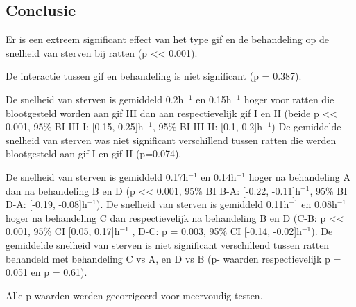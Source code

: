 \documentclass[
  12pt,dutch,coursenotes]{book}
\begin{document}
\hypertarget{conclusie-3}{%
\subsection{Conclusie}\label{conclusie-3}}

Er is een extreem significant effect van het type gif en de behandeling op de snelheid van sterven bij ratten (p \textless\textless{} 0.001).

De interactie tussen gif en behandeling is niet significant (p = 0.387).

De snelheid van sterven is gemiddeld 0.2h\(^{-1}\) en 0.15h\(^{-1}\) hoger voor ratten die blootgesteld worden aan gif III dan aan respectievelijk gif I en II (beide p \textless\textless{} 0.001, 95\% BI III-I: {[}0.15, 0.25{]}h\(^{-1}\), 95\% BI III-II: {[}0.1, 0.2{]}h\(^{-1}\))
De gemiddelde snelheid van sterven was niet significant verschillend tussen ratten die werden blootgesteld aan gif I en gif II (p=0.074).

De snelheid van sterven is gemiddeld 0.17h\(^{-1}\) en 0.14h\(^{-1}\) hoger na behandeling A dan na behandeling B en D (p \textless\textless{} 0.001, 95\% BI B-A: {[}-0.22, -0.11{]}h\(^{-1}\), 95\% BI D-A: {[}-0.19, -0.08{]}h\(^{-1}\)).
De snelheid van sterven is gemiddeld 0.11h\(^{-1}\) en 0.08h\(^{-1}\) hoger na behandeling C dan respectievelijk na behandeling B en D (C-B: p \textless\textless{} 0.001, 95\% CI {[}0.05, 0.17{]}h\(^{-1}\) , D-C: p = 0.003, 95\% CI {[}-0.14, -0.02{]}h\(^{-1}\)).
De gemiddelde snelheid van sterven is niet significant verschillend tussen ratten behandeld met behandeling C vs A, en D vs B (p- waarden respectievelijk p = 0.051 en p = 0.61).

Alle p-waarden werden gecorrigeerd voor meervoudig testen.

  
\end{document}
